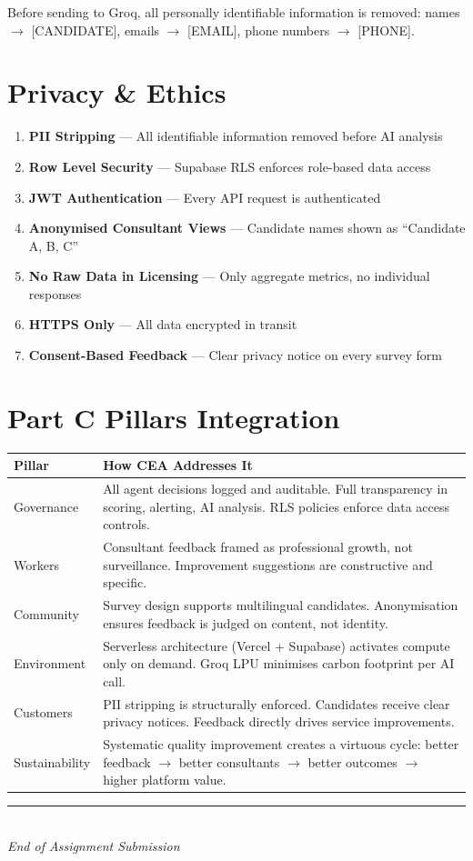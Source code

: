 \documentclass[11pt, a4paper]{article}
\begin{document}
Before sending to Groq, all personally identifiable information is removed: names $\rightarrow$ [CANDIDATE], emails $\rightarrow$ [EMAIL], phone numbers $\rightarrow$ [PHONE].

\section{Privacy \& Ethics}

\begin{enumerate}[leftmargin=2em]
\item \textbf{PII Stripping} — All identifiable information removed before AI analysis
\item \textbf{Row Level Security} — Supabase RLS enforces role-based data access
\item \textbf{JWT Authentication} — Every API request is authenticated
\item \textbf{Anonymised Consultant Views} — Candidate names shown as ``Candidate A, B, C''
\item \textbf{No Raw Data in Licensing} — Only aggregate metrics, no individual responses
\item \textbf{HTTPS Only} — All data encrypted in transit
\item \textbf{Consent-Based Feedback} — Clear privacy notice on every survey form
\end{enumerate}

\section{Part C Pillars Integration}

\begin{tabularx}{\textwidth}{l X}
\toprule
\textbf{Pillar} & \textbf{How CEA Addresses It} \\
\midrule
Governance & All agent decisions logged and auditable. Full transparency in scoring, alerting, AI analysis. RLS policies enforce data access controls. \\
Workers & Consultant feedback framed as professional growth, not surveillance. Improvement suggestions are constructive and specific. \\
Community & Survey design supports multilingual candidates. Anonymisation ensures feedback is judged on content, not identity. \\
Environment & Serverless architecture (Vercel + Supabase) activates compute only on demand. Groq LPU minimises carbon footprint per AI call. \\
Customers & PII stripping is structurally enforced. Candidates receive clear privacy notices. Feedback directly drives service improvements. \\
Sustainability & Systematic quality improvement creates a virtuous cycle: better feedback $\rightarrow$ better consultants $\rightarrow$ better outcomes $\rightarrow$ higher platform value. \\
\bottomrule
\end{tabularx}

\vspace{1cm}

\begin{center}
\color{grey}\rule{0.5\textwidth}{0.5pt}\\[10pt]
{\small\itshape End of Assignment Submission}
\end{center}
\end{document}
